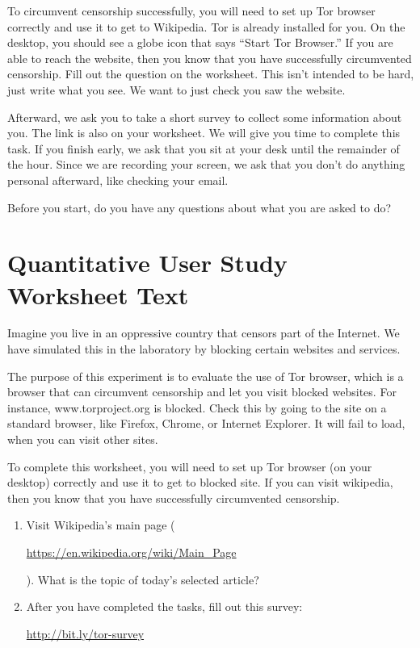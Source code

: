 \documentclass[USenglish,oneside,twocolumn]{article}
\begin{document}
To circumvent censorship successfully, you will need to set up Tor browser correctly and use it to get to Wikipedia. Tor is already installed for you. On the desktop, you should see a globe icon that says ``Start Tor Browser.'' If you are able to reach the website, then you know that you have successfully circumvented censorship. Fill out the question on the worksheet. This isn't intended to be hard, just write what you see. We want to just check you saw the website. 

Afterward, we ask you to take a short survey to collect some information about you. The link is also on your worksheet.
We will give you time to complete this task. If you finish early, we ask that you sit at your desk until the remainder of the hour. Since we are recording your screen, we ask that you don't do anything personal afterward, like checking your email.

Before you start, do you have any questions about what you are asked to do? 

\section{Quantitative User Study Worksheet Text} 
\label{summative-worksheet}
Imagine you live in an oppressive country that censors part of the Internet. We have simulated this in the laboratory by blocking certain websites and services.

The purpose of this experiment is to evaluate the use of Tor browser, which is a browser that can circumvent censorship and let you visit blocked websites. For instance, www.torproject.org is blocked. Check this by going to the site on a standard browser, like Firefox, Chrome, or Internet Explorer. It will fail to load, when you can visit other sites.

To complete this worksheet, you will need to set up Tor browser (on your desktop) correctly and use it to get to blocked site. If you can visit wikipedia, then you know that you have successfully circumvented censorship.

\begin{enumerate}
\item Visit Wikipedia's main page (\begin{NoHyper}\url{https://en.wikipedia.org/wiki/Main_Page}\end{NoHyper}). What is the topic of today's selected article?
\item After you have completed the tasks, fill out this survey: \begin{NoHyper}\url{http://bit.ly/tor-survey}\end{NoHyper}
\end{enumerate}
\end{document}
